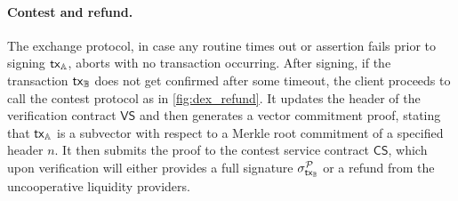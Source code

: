 \paragraph*{Contest and refund.}
The exchange protocol, in case any routine times out or assertion fails prior to signing $\mathsf{tx}_{\mathbb{A}}$, aborts with no transaction occurring. After signing, if the transaction $\mathsf{tx}_{\mathbb{B}}$ does not get confirmed after some timeout, the client proceeds to call the contest protocol as in \cref{fig:dex_refund}. It updates the header of the verification contract $\mathsf{VS}$ and then generates a vector commitment proof, stating that $\mathsf{tx}_{\mathbb{A}}$ is a subvector with respect to a Merkle root commitment of a specified header $n$. It then submits the proof to the contest service contract $\mathsf{CS}$, which upon verification will either provides a full signature $\sigma^{\mathcal{P}}_{\mathsf{tx}_{\mathbb{B}}}$ or a refund from the uncooperative liquidity providers.
